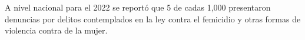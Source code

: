 A nivel nacional para el 2022 se reportó que 5 de cadas 1,000 presentaron denuncias por delitos contemplados en la ley contra el femicidio y otras formas de violencia contra de la mujer.